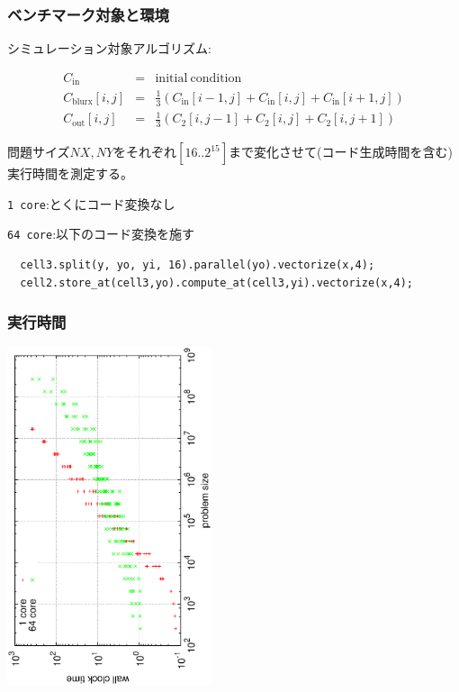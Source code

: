 \documentclass[dvipdfmx,cjk]{beamer}
\begin{document}
\begin{frame}[fragile]\frametitle{ベンチマーク対象と環境}

シミュレーション対象アルゴリズム:

\begingroup \footnotesize
\begin{eqnarray*}
C_\mathrm{in} &=& \mathrm{initial~condition} \\
C_\mathrm{blurx} [i,j] &=& \frac{1}{3}\left(C_\mathrm{in}[i-1,j] + C_\mathrm{in}[i,j] + C_\mathrm{in}[i+1,j]\right) \\
C_\mathrm{out} [i,j] &=& \frac{1}{3}\left(C_\mathrm{2}[i,j-1] + C_\mathrm{2}[i,j] + C_\mathrm{2}[i,j+1]\right)
\end{eqnarray*}
\endgroup

問題サイズ$NX,NY$をそれぞれ$[16 .. 2^{15}]$まで変化させて(コード生成時間を含む)実行時間を測定する。

{\tt 1 core}:とくにコード変換なし

{\tt 64 core}:以下のコード変換を施す

\begingroup
    \fontsize{8pt}{9pt}\selectfont
\begin{verbatim}
  cell3.split(y, yo, yi, 16).parallel(yo).vectorize(x,4);
  cell2.store_at(cell3,yo).compute_at(cell3,yi).vectorize(x,4);
\end{verbatim}
\endgroup


\end{frame}

\begin{frame}[fragile]\frametitle{実行時間}
\begin{center}
\includegraphics[width=6cm,angle=270]{figure/result-wct.eps}
\end{center}
\end{frame}
\end{document}
